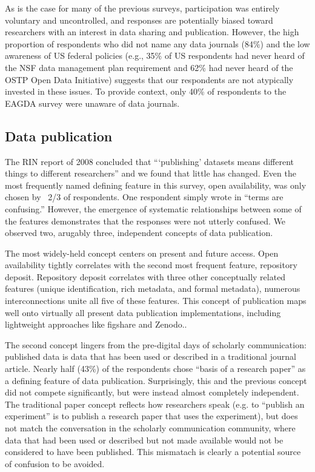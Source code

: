 \documentclass[10pt]{article}
\begin{document}
As is the case for many of the previous surveys, participation was entirely voluntary and uncontrolled, and responses are potentially biased toward researchers with an interest in data sharing and publication.
However, the high proportion of respondents who did not name any data journals (84\%) and the low awareness of US federal policies (e.g., 35\% of US respondents had never heard of the NSF data management plan requirement and 62\% had never heard of the OSTP Open Data Initiative) suggests that our respondents are not atypically invested in these issues.
To provide context, only 40\% of respondents to the EAGDA survey were unaware of data journals.

\subsection*{Data publication}

The RIN report of 2008 concluded that ```publishing' datasets means different things to different researchers''\cite{swan_share_2008} and we found that little has changed.
Even the most frequently named defining feature in this survey, open availability, was only chosen by ~2/3 of respondents.
One respondent simply wrote in ``terms are confusing.''
However, the emergence of systematic relationships between some of the features demonstrates that the responses were not utterly confused.
We observed two, arugably three, independent concepts of data publication.

The most widely-held concept centers on present and future access.
Open availability tightly correlates with the second most frequent feature, repository deposit.
Repository deposit correlates with three other conceptually related features (unique identification, rich metadata, and formal metadata), numerous interconnections unite all five of these features.
This concept of publication maps well onto virtually all present data publication implementations, including lightweight approaches like figshare and Zenodo..

The second concept lingers from the pre-digital days of scholarly communication: published data is data that has been used or described in a traditional journal article. 
Nearly half (43\%) of the respondents chose ``basis of a research paper'' as a defining feature of data publication. 
Surprisingly, this and the previous concept did not compete significantly, but were instead almost completely independent.
The traditional paper concept reflects how researchers speak (e.g. to ``publish an experiment'' is to publish a research paper that uses the experiment), but does not match the conversation in the scholarly communication community, where data that had been used or described but not made available would not be considered to have been published.
This mismatach is clearly a potential source of confusion to be avoided.
\end{document}
